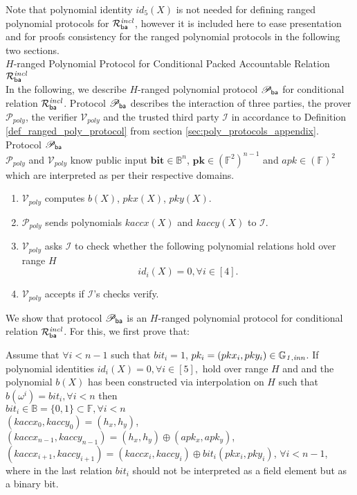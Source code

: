 \noindent Note that polynomial identity $id_5(X)$ is not needed for defining ranged polynomial protocols for 
$\mathcal{R}^{\mathit{incl}}_{\mathsf{ba}}$, however it is included here to ease presentation and for proofs consistency 
for the ranged polynomial protocols in the following two sections. \\

\noindent \textsf{$H$-ranged Polynomial Protocol for Conditional Packed Accountable Relation $\mathcal{R}^{\mathit{incl}}_{\mathsf{ba}}$} \\

\noindent In the following, we describe $H$-ranged polynomial protocol $\mathscr{P}_{\mathsf{ba}}$ for conditional relation 
$\mathcal{R}^{\mathit{incl}}_{\mathsf{ba}}$. Protocol $\mathscr{P}_{\mathsf{ba}}$ describes the interaction of three parties, the prover 
$\mathcal{P}_{poly}$, the verifier $\mathcal{V}_{poly}$ and the trusted third party $\mathcal{I}$ in accordance to 
Definition \ref{def_ranged_poly_protocol} from section \ref{sec:poly_protocols_appendix}. \\

\noindent \textsf{Protocol $\mathscr{P}_{\mathsf{ba}}$} \\

\noindent $\mathcal{P}_{poly}$ and $\mathcal{V}_{poly}$ know public input 
$\mathbf{bit} \in \mathbb{B}^n$, $\mathbf{pk} \in (\mathbb{F}^2)^{n-1}$ and $\mathit{apk} \in (\mathbb{F})^2$ 
which are interpreted as per their respective domains.
\begin{enumerate}
\item $\mathcal{V}_{poly}$ computes $b(X)$, $pkx(X)$, $pky(X)$.
\item $\mathcal{P}_{poly}$ sends polynomials $kaccx(X)$ and $kaccy(X)$ to $\mathcal{I}$. 
\item $\mathcal{V}_{poly}$ asks $\mathcal{I}$ to check whether the following polynomial relations hold over range $H$ 
$$id_i(X) = 0, \forall i \in [4].$$
\item $\mathcal{V}_{poly}$  accepts if $\mathcal{I}$'s checks verify. 
\end{enumerate}

\noindent We show that protocol $\mathscr{P}_{\mathsf{ba}}$ is an $H$-ranged polynomial protocol for 
conditional relation $\mathcal{R}^{\mathit{incl}}_{\mathsf{ba}}$. For this, we first prove that:
\begin{claim} Assume that $\forall i < n-1$ such that $\mathit{bit}_i = 1$, $pk_i = (pkx_i, pky_i) \in \mathbb{G}_{\mathit{1,inn}}$. 
If polynomial identities $id_i(X) = 0, \forall i \in [5],$ hold over range 
$H$ and and the polynomial $b(X)$ has been constructed via interpolation on $H$ such that $b(\omega^i) = \mathit{bit}_i, \forall i <n$ then \\
$\mathit{bit}_i \in \mathbb{B} = \{0,1\} \subset \mathbb{F}, \forall i <n$ \\
$(kaccx_{0}, kaccy_{0}) = (h_x, h_y)$, \\
$(kaccx_{n-1}, kaccy_{n-1}) = (h_x, h_y) \oplus (apk_x, apk_y)$, \\
$(kaccx_{i+1}, kaccy_{i+1}) =  (kaccx_{i}, kaccy_{i}) \oplus \mathit{bit}_i(pkx_{i}, pky_{i})$, $\forall i < n-1$, 
where in the last relation $\mathit{bit_i}$ should not be interpreted as a field element but as a binary bit.
\label{claim:keys_affine_comm}
\end{claim}

